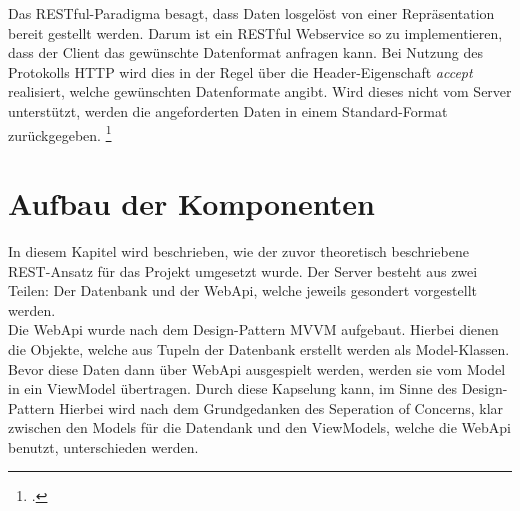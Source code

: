 Das RESTful-Paradigma besagt, dass Daten losgelöst von einer Repräsentation bereit gestellt werden. Darum ist ein RESTful Webservice so zu implementieren, dass der Client das gewünschte Datenformat anfragen kann. Bei Nutzung des Protokolls HTTP wird dies in der Regel über die Header-Eigenschaft \textit{accept} realisiert, welche gewünschten Datenformate angibt. Wird dieses nicht vom Server unterstützt, werden die angeforderten Daten in einem Standard-Format zurückgegeben. \footcite[S. 26ff.]{REST-und-HTTP}
\section{Aufbau der Komponenten}
\label{sec:aufbau-Komponenten}
In diesem Kapitel wird beschrieben, wie der zuvor theoretisch beschriebene REST-Ansatz für das Projekt umgesetzt wurde. Der Server besteht aus zwei Teilen: Der Datenbank und der WebApi, welche jeweils gesondert vorgestellt werden.\\
Die WebApi wurde nach dem Design-Pattern \ac{MVVM} aufgebaut. Hierbei dienen die Objekte, welche aus Tupeln der Datenbank erstellt werden als Model-Klassen. Bevor diese Daten dann über WebApi ausgespielt werden, werden sie vom Model in ein ViewModel übertragen. Durch diese Kapselung kann, im Sinne des Design-Pattern Hierbei wird nach dem Grundgedanken des \ac{Seperation of Concerns}, klar zwischen den Models für die Datendank und den ViewModels, welche die WebApi benutzt, unterschieden werden. 
